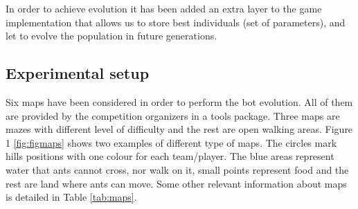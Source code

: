 \documentclass[runningheads]{llncs}
\begin{document}
 
 
 
 

In order to achieve evolution it has been added an extra layer to the game implementation that allows us to store best individuals (set of parameters), and let to evolve the population in future generations. 

\subsection{Experimental setup}
Six maps have been considered in order to perform the bot evolution. All of them are provided by the competition organizers in a tools package. Three maps are mazes with different level of difficulty and the rest are open walking areas. Figure 1 \ref{fig:figmaps} shows two examples of different type of maps. The circles mark hills positions with one colour for each team/player. The blue areas represent water that ants cannot cross, nor walk on it, small points represent food and the rest are land where ants can move. Some other relevant information about maps is detailed in Table \ref{tab:maps}. 


\end{document}
